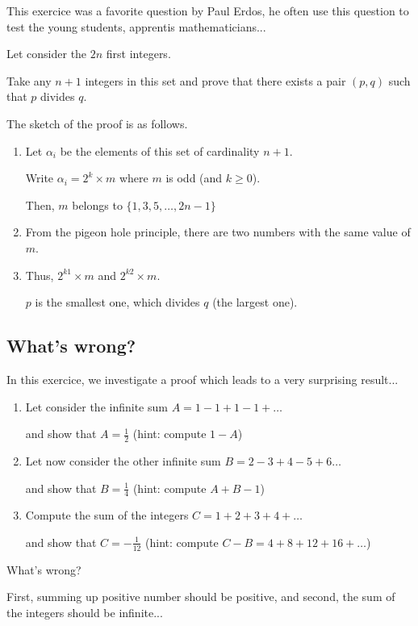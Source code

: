 This exercice was a favorite question by Paul Erdos,
he often use this question to test the young students, apprentis mathematicians...
\bigskip

Let consider the $2n$ first integers.

Take any $n+1$ integers in this set and prove that there exists a pair $(p,q)$
such that $p$ divides $q$. 

The sketch of the proof is as follows.

\begin{enumerate}
\item
Let $\alpha_i$ be the elements of this set of cardinality $n+1$.

Write $\alpha_i = 2^k \times m$ where $m$ is odd (and $k \geq 0$).

Then, $m$ belongs to $\{1,3,5, \ldots, 2n-1 \}$
\item
From the pigeon hole principle, there are two numbers with the same value of $m$. 
\item 
Thus, $2^{k1} \times m$ and $2^{k2} \times m$.

$p$ is the smallest one, which divides $q$ (the largest one).
\end{enumerate}


\subsection{What's wrong?}

In this exercice, we investigate a proof which leads to a very surprising result...

\begin{enumerate}
\item
Let consider the infinite sum $A = 1-1+1-1+ \ldots$

and show that $A=\frac{1}{2}$ (hint: compute $1-A$)
\item
Let now consider the other infinite sum $B=2-3+4-5+6 \ldots$

and show that $B=\frac{1}{4}$ (hint: compute $A+B-1$)
\item 
Compute the sum of the integers $C=1+2+3+4+ \ldots$

and show that $C=-\frac{1}{12}$ (hint: compute $C-B=4+8+12+16+ \ldots$)
\end{enumerate}

What's wrong?

First, summing up positive number should be positive, 
and second, the sum of the integers should be infinite...




